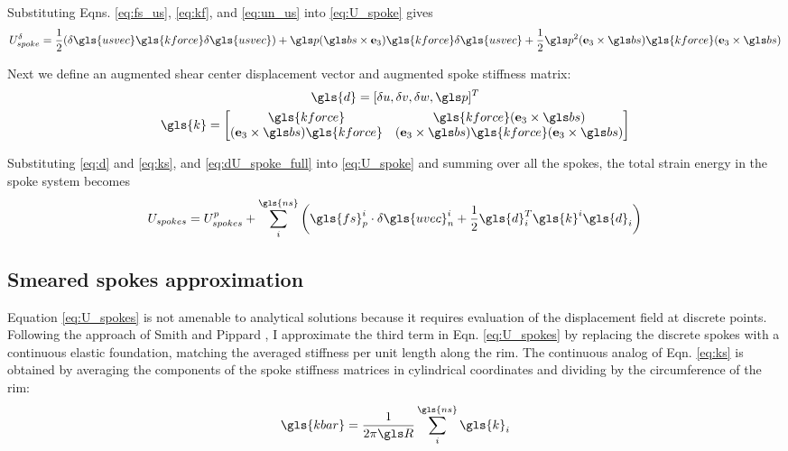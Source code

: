 \documentclass[\rootdir/thesis.tex]{subfiles}
\begin{document}
Substituting Eqns. \eqref{eq:fs_us}, \eqref{eq:kf}, and \eqref{eq:un_us} into \eqref{eq:U_spoke} gives
\begin{equation}
\label{eq:dU_spoke_full}
U_{spoke}^{\delta} = \frac{1}{2}(\delta\gls{usvec} \gls{kforce} \delta\gls{usvec}) +
    \p(\bs\times\eh)\gls{kforce}\delta\gls{usvec} +
    \frac{1}{2}\p^2(\eh\times\bs)\gls{kforce}(\eh\times\bs)
\end{equation}

Next we define an augmented shear center displacement vector and augmented spoke stiffness matrix:
\begin{gather}
\gls{d} = [\delta u, \delta v, \delta w, \p]^T\label{eq:d}\\
\gls{k} =
\begin{bmatrix}
\gls{kforce}                & \gls{kforce} (\eh\times\bs)\\
(\eh\times\bs) \gls{kforce} & (\eh\times\bs)\gls{kforce}(\eh\times\bs)
\end{bmatrix}\label{eq:ks}
\end{gather}

Substituting \eqref{eq:d} and \eqref{eq:ks}, and \eqref{eq:dU_spoke_full} into \eqref{eq:U_spoke} and summing over all the spokes, the total strain energy in the spoke system becomes
\begin{equation}
\label{eq:U_spokes}
U_{spokes} = U_{spokes}^p + \sum_i^{\gls{ns}} \left(\gls{fs}_p^i \cdot \delta\gls{uvec}_n^i +
    \frac{1}{2}\gls{d}_i^T \gls{k}^i \gls{d}_i\right)
\end{equation}

\subsection{Smeared spokes approximation}
\label{sec:smeared_spokes}
Equation \ref{eq:U_spokes} is not amenable to analytical solutions because it requires evaluation of the displacement field at discrete points. Following the approach of Smith \cite{Smith1901} and Pippard \cite{Pippard1931}, I approximate the third term in Eqn. \eqref{eq:U_spokes} by replacing the discrete spokes with a continuous elastic foundation, matching the averaged stiffness per unit length along the rim. The continuous analog of Eqn. \eqref{eq:ks} is obtained by averaging the components of the spoke stiffness matrices in cylindrical coordinates and dividing by the circumference of the rim:
\begin{equation}
\label{eq:k_bar}
\gls{kbar} = \frac{1}{2\pi \R} \sum_i^{\gls{ns}} \gls{k}_i
\end{equation}
\end{document}
